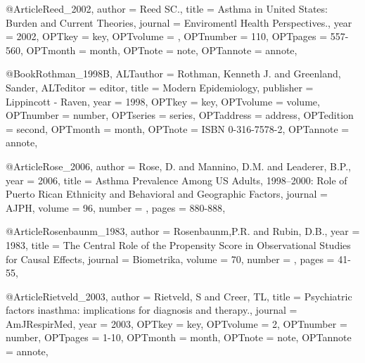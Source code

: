 {{{@Article{Reed_2002,
author = {Reed SC.},
title = {Asthma in United States: Burden and Current Theories},
journal = {Enviromentl Health Perspectives.},
year = {2002},
OPTkey = {key},
OPTvolume = {},
OPTnumber = {110},
OPTpages = {557-560},
OPTmonth = {month},
OPTnote = {note},
OPTannote = {annote},
}


@Book{Rothman_1998B,
ALTauthor = {Rothman, Kenneth J. and Greenland, Sander},
ALTeditor = {editor},
title = {Modern Epidemiology},
publisher = {Lippincott - Raven},
year = {1998},
OPTkey = {key},
OPTvolume = {volume},
OPTnumber = {number},
OPTseries = {series},
OPTaddress = {address},
OPTedition = {second},
OPTmonth = {month},
OPTnote = {{ISBN} 0-316-7578-2},
OPTannote = {annote},
}


@Article{Rose_2006,
  author = {Rose, D. and Mannino, D.M. and Leaderer, B.P.},
  year = {2006},
  title = {Asthma Prevalence Among US Adults, 1998–2000: Role of Puerto Rican Ethnicity and Behavioral and Geographic Factors},
  journal = AJPH,
  volume =  {96},
  number = {},
  pages = {880-888},
}

@Article{Rosenbaunm_1983,
  author = {Rosenbaunm,P.R. and Rubin, D.B.},
  year = {1983},
  title = {The Central Role of the Propensity Score in Observational Studies for Causal Effects},
  journal = {Biometrika},
  volume =  {70},
  number = {},
  pages = {41-55},
}

@Article{Rietveld_2003,
author = {Rietveld, S and Creer, TL},
title = {Psychiatric factors inasthma: implications for diagnosis and therapy.},
journal = {AmJRespirMed},
year = {2003},
OPTkey = {key},
OPTvolume = {2},
OPTnumber = {number},
OPTpages = {1-10},
OPTmonth = {month},
OPTnote = {note},
OPTannote = {annote},
}

}}}
